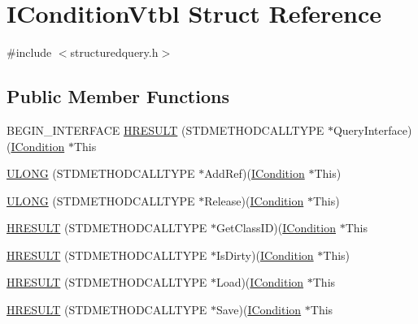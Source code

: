 \hypertarget{struct_i_condition_vtbl}{}\section{I\+Condition\+Vtbl Struct Reference}
\label{struct_i_condition_vtbl}


{\ttfamily \#include $<$structuredquery.\+h$>$}

\subsection*{Public Member Functions}
\begin{DoxyCompactItemize}
\item 
B\+E\+G\+I\+N\+\_\+\+I\+N\+T\+E\+R\+F\+A\+CE \hyperlink{struct_i_condition_vtbl_a4405576df895a69cd3fcb1fe748263da}{H\+R\+E\+S\+U\+LT} (S\+T\+D\+M\+E\+T\+H\+O\+D\+C\+A\+L\+L\+T\+Y\+PE $\ast$Query\+Interface)(\hyperlink{structuredquery_8h_a44e1be344248ef67d647837c4aae42fa}{I\+Condition} $\ast$This
\item 
\hyperlink{struct_i_condition_vtbl_ac5752cf4f21c2f306b038d6965831dae}{U\+L\+O\+NG} (S\+T\+D\+M\+E\+T\+H\+O\+D\+C\+A\+L\+L\+T\+Y\+PE $\ast$Add\+Ref)(\hyperlink{structuredquery_8h_a44e1be344248ef67d647837c4aae42fa}{I\+Condition} $\ast$This)
\item 
\hyperlink{struct_i_condition_vtbl_afb9bab06eab7e92742e72ad3e1926acf}{U\+L\+O\+NG} (S\+T\+D\+M\+E\+T\+H\+O\+D\+C\+A\+L\+L\+T\+Y\+PE $\ast$Release)(\hyperlink{structuredquery_8h_a44e1be344248ef67d647837c4aae42fa}{I\+Condition} $\ast$This)
\item 
\hyperlink{struct_i_condition_vtbl_a8ad50792f4181577f653263e22cd22b2}{H\+R\+E\+S\+U\+LT} (S\+T\+D\+M\+E\+T\+H\+O\+D\+C\+A\+L\+L\+T\+Y\+PE $\ast$Get\+Class\+ID)(\hyperlink{structuredquery_8h_a44e1be344248ef67d647837c4aae42fa}{I\+Condition} $\ast$This
\item 
\hyperlink{struct_i_condition_vtbl_a9f95b557f9136d0a011ca095c177a4de}{H\+R\+E\+S\+U\+LT} (S\+T\+D\+M\+E\+T\+H\+O\+D\+C\+A\+L\+L\+T\+Y\+PE $\ast$Is\+Dirty)(\hyperlink{structuredquery_8h_a44e1be344248ef67d647837c4aae42fa}{I\+Condition} $\ast$This)
\item 
\hyperlink{struct_i_condition_vtbl_a34b3bbd6972c5f0b535903d6dd770dfe}{H\+R\+E\+S\+U\+LT} (S\+T\+D\+M\+E\+T\+H\+O\+D\+C\+A\+L\+L\+T\+Y\+PE $\ast$Load)(\hyperlink{structuredquery_8h_a44e1be344248ef67d647837c4aae42fa}{I\+Condition} $\ast$This
\item 
\hyperlink{struct_i_condition_vtbl_a6331b816734cc629daeff5afd7cf457b}{H\+R\+E\+S\+U\+LT} (S\+T\+D\+M\+E\+T\+H\+O\+D\+C\+A\+L\+L\+T\+Y\+PE $\ast$Save)(\hyperlink{structuredquery_8h_a44e1be344248ef67d647837c4aae42fa}{I\+Condition} $\ast$This

\end{DoxyCompactItemize}
